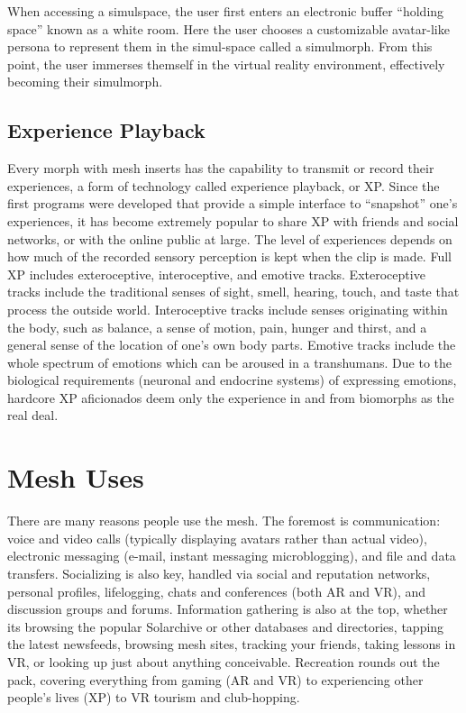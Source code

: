 When accessing a simulspace, the user first enters 
an electronic buffer ``holding space'' known as a 
white room. Here the user chooses a customizable 
avatar-like persona to represent them in the simul-space
called a simulmorph. From this point, the user
immerses themself in the virtual reality environment, 
effectively becoming their simulmorph.

\subsection{Experience Playback}

Every morph with mesh inserts has the capability 
to transmit or record their experiences, a form of 
technology called experience playback, or XP. Since 
the first programs were developed that provide a 
simple interface to ``snapshot'' one's experiences, 
it has become extremely popular to share XP with 
friends and social networks, or with the online public 
at large.
The level of experiences depends on how much of 
the recorded sensory perception is kept when the clip 
is made. Full XP includes exteroceptive, interoceptive, 
and emotive tracks. Exteroceptive tracks include the 
traditional senses of sight, smell, hearing, touch, and 
taste that process the outside world. Interoceptive 
tracks include senses originating within the body, such 
as balance, a sense of motion, pain, hunger and thirst, 
and a general sense of the location of one's own body 
parts. Emotive tracks include the whole spectrum of 
emotions which can be aroused in a transhumans. 
Due to the biological requirements (neuronal and 
endocrine systems) of expressing emotions, hardcore 
XP aficionados deem only the experience in and from 
biomorphs as the real deal.

\section{Mesh Uses}

There are many reasons people use the mesh. The 
foremost is communication: voice and video calls 
(typically displaying avatars rather than actual 
video), electronic messaging (e-mail, instant messaging
microblogging), and file and data transfers.
Socializing is also key, handled via social and reputation
networks, personal profiles, lifelogging, chats
and conferences (both AR and VR), and discussion 
groups and forums. Information gathering is also 
at the top, whether its browsing the popular Solarchive
or other databases and directories, tapping
the latest newsfeeds, browsing mesh sites, tracking 
your friends, taking lessons in VR, or looking up just 
about anything conceivable. Recreation rounds out 
the pack, covering everything from gaming (AR and 
VR) to experiencing other people's lives (XP) to VR 
tourism and club-hopping.

